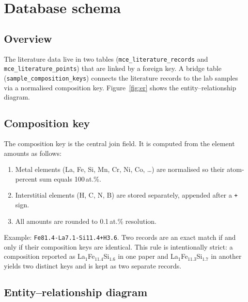 \documentclass[11pt,a4paper]{article}
\begin{document}
\section{Database schema}
\label{sec:schema}

\subsection{Overview}

The literature data live in two tables (\texttt{mce\_literature\_records}
and \texttt{mce\_literature\_points}) that are linked by a foreign key.
A bridge table (\texttt{sample\_composition\_keys}) connects the literature
records to the lab samples via a normalised composition key.
Figure~\ref{fig:er} shows the entity–relationship diagram.

\subsection{Composition key}

The composition key is the central join field.  It is computed from the
element amounts as follows:
\begin{enumerate}
  \item Metal elements (La, Fe, Si, Mn, Cr, Ni, Co, \ldots) are
        normalised so their atom-percent sum equals 100\,at.\%.
  \item Interstitial elements (H, C, N, B) are stored separately,
        appended after a \texttt{+} sign.
  \item All amounts are rounded to 0.1\,at.\% resolution.
\end{enumerate}
Example: \texttt{Fe81.4-La7.1-Si11.4+H3.6}.
Two records are an exact match if and only if their composition keys are
identical.  This rule is intentionally strict: a composition reported as
La$_1$Fe$_{11.4}$Si$_{1.6}$ in one paper and La$_1$Fe$_{11.3}$Si$_{1.7}$
in another yields two distinct keys and is kept as two separate records.

\subsection{Entity--relationship diagram}
\end{document}
